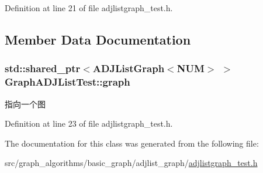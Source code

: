 Definition at line 21 of file adjlistgraph\+\_\+test.\+h.



\subsection{Member Data Documentation}
\hypertarget{class_graph_a_d_j_list_test_af1b700b5e683b43e3e1b215a4d589b6b}{}
\subsubsection[{graph}]{\setlength{\rightskip}{0pt plus 5cm}std\+::shared\+\_\+ptr$<${\bf A\+D\+J\+List\+Graph}$<${\bf N\+U\+M}$>$ $>$ Graph\+A\+D\+J\+List\+Test\+::graph\hspace{0.3cm}{\ttfamily [protected]}}\label{class_graph_a_d_j_list_test_af1b700b5e683b43e3e1b215a4d589b6b}
指向一个图 

Definition at line 23 of file adjlistgraph\+\_\+test.\+h.



The documentation for this class was generated from the following file\+:\begin{DoxyCompactItemize}
\item 
src/graph\+\_\+algorithms/basic\+\_\+graph/adjlist\+\_\+graph/\hyperlink{adjlistgraph__test_8h}{adjlistgraph\+\_\+test.\+h}\end{DoxyCompactItemize}
